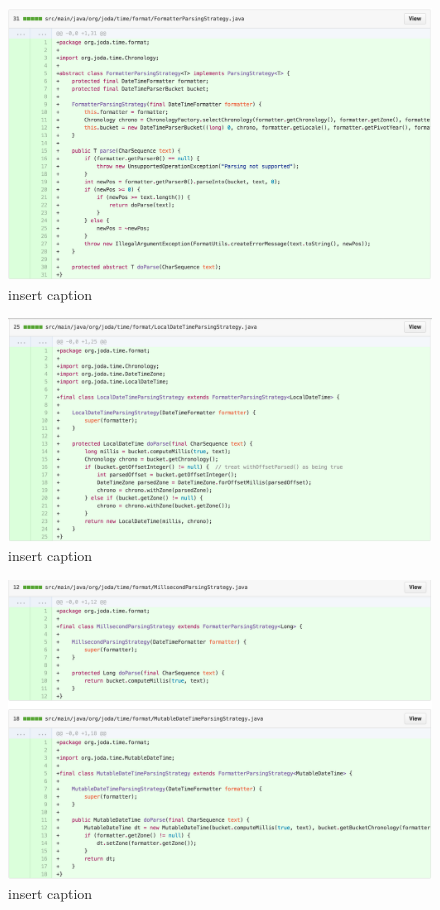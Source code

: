 \begin{figure}[H]
	\centering
	\includegraphics[width=\linewidth]{code105}
	\caption{insert caption}
\end{figure}
\begin{figure}[H]
	\centering
	\includegraphics[width=\linewidth]{code106}
	\caption{insert caption}
\end{figure}
\begin{figure}[H]
	\centering
	\includegraphics[width=\linewidth]{code107}
	\caption{insert caption}
\end{figure}
